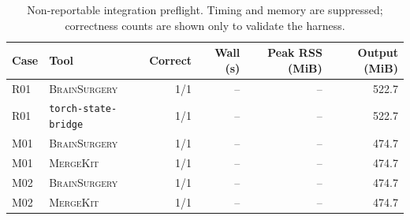 \begin{table}[t]
\centering
\small
\begin{tabular}{llrrrr}
\toprule
Case & Tool & Correct & Wall (s) & Peak RSS (MiB) & Output (MiB) \\
\midrule
R01 & \textsc{BrainSurgery} & 1/1 & -- & -- & 522.7 \\
R01 & \texttt{torch-state-bridge} & 1/1 & -- & -- & 522.7 \\
M01 & \textsc{BrainSurgery} & 1/1 & -- & -- & 474.7 \\
M01 & \textsc{MergeKit} & 1/1 & -- & -- & 474.7 \\
M02 & \textsc{BrainSurgery} & 1/1 & -- & -- & 474.7 \\
M02 & \textsc{MergeKit} & 1/1 & -- & -- & 474.7 \\
\bottomrule
\end{tabular}
\caption{Non-reportable integration preflight. Timing and memory are
suppressed; correctness counts are shown only to validate the harness.}
\label{tab:competing-tools-preflight}
\end{table}
